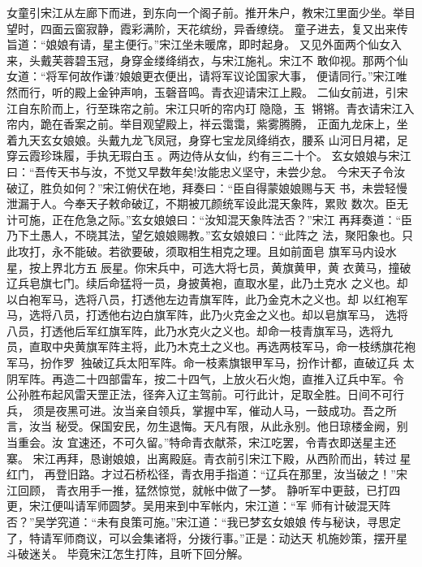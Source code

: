女童引宋江从左廊下而进，到东向一个阁子前。推开朱户，教宋江里面少坐。举目
望时，四面云窗寂静，霞彩满阶，天花缤纷，异香缭绕。
童子进去，复又出来传旨道：“娘娘有请，星主便行。”宋江坐未暖席，即时起身。
又见外面两个仙女入来，头戴芙蓉碧玉冠，身穿金缕绛绡衣，与宋江施礼。宋江不
敢仰视。那两个仙女道：“将军何故作谦?娘娘更衣便出，请将军议论国家大事，
便请同行。”宋江唯然而行，听的殿上金钟声响，玉磬音鸣。青衣迎请宋江上殿。
二仙女前进，引宋江自东阶而上，行至珠帘之前。宋江只听的帘内玎隐隐，玉
锵锵。青衣请宋江入帘内，跪在香案之前。举目观望殿上，祥云霭霭，紫雾腾腾，
正面九龙床上，坐着九天玄女娘娘。头戴九龙飞凤冠，身穿七宝龙凤绛绡衣，腰系
山河日月裙，足穿云霞珍珠履，手执无瑕白玉。两边侍从女仙，约有三二十个。
玄女娘娘与宋江曰：“吾传天书与汝，不觉又早数年矣!汝能忠义坚守，未尝少怠。
今宋天子令汝破辽，胜负如何？”宋江俯伏在地，拜奏曰：“臣自得蒙娘娘赐与天
书，未尝轻慢泄漏于人。今奉天子敕命破辽，不期被兀颜统军设此混天象阵，累败
数次。臣无计可施，正在危急之际。”玄女娘娘曰：“汝知混天象阵法否？”宋江
再拜奏道：“臣乃下土愚人，不晓其法，望乞娘娘赐教。”玄女娘娘曰：“此阵之
法，聚阳象也。只此攻打，永不能破。若欲要破，须取相生相克之理。且如前面皂
旗军马内设水星，按上界北方五辰星。你宋兵中，可选大将七员，黄旗黄甲，黄
衣黄马，撞破辽兵皂旗七门。续后命猛将一员，身披黄袍，直取水星，此乃土克水
之义也。却以白袍军马，选将八员，打透他左边青旗军阵，此乃金克木之义也。却
以红袍军马，选将八员，打透他右边白旗军阵，此乃火克金之义也。却以皂旗军马，
选将八员，打透他后军红旗军阵，此乃水克火之义也。却命一枝青旗军马，选将九
员，直取中央黄旗军阵主将，此乃木克土之义也。再选两枝军马，命一枝绣旗花袍
军马，扮作罗，独破辽兵太阳军阵。命一枝素旗银甲军马，扮作计都，直破辽兵
太阴军阵。再造二十四部雷车，按二十四气，上放火石火炮，直推入辽兵中军。令
公孙胜布起风雷天罡正法，径奔入辽主驾前。可行此计，足取全胜。日间不可行兵，
须是夜黑可进。汝当亲自领兵，掌握中军，催动人马，一鼓成功。吾之所言，汝当
秘受。保国安民，勿生退悔。天凡有限，从此永别。他日琼楼金阙，别当重会。汝
宜速还，不可久留。”特命青衣献茶，宋江吃罢，令青衣即送星主还寨。
宋江再拜，恳谢娘娘，出离殿庭。青衣前引宋江下殿，从西阶而出，转过星红门，
再登旧路。才过石桥松径，青衣用手指道：“辽兵在那里，汝当破之！”宋江回顾，
青衣用手一推，猛然惊觉，就帐中做了一梦。
静听军中更鼓，已打四更，宋江便叫请军师圆梦。吴用来到中军帐内，宋江道：“军
师有计破混天阵否？”吴学究道：“未有良策可施。”宋江道：“我已梦玄女娘娘
传与秘诀，寻思定了，特请军师商议，可以会集诸将，分拨行事。”正是：动达天
机施妙策，摆开星斗破迷关。
毕竟宋江怎生打阵，且听下回分解。
